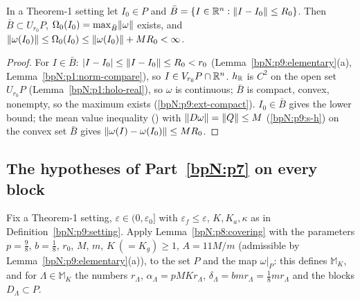 \begin{lemma}\label{bpN:p9:omega0}
In a Theorem-1 setting let $I_0\in P$ and $\bar B=\{I\in\mathbb{R}^n:\lVert I-I_0\rVert\le R_0\}$. Then $\bar B\subset U_{r_0}P$, $\Omega_0(I_0)=\max_{\bar B}\lVert \omega\rVert$ exists, and $\lVert \omega(I_0)\rVert\le\Omega_0(I_0)\le\lVert \omega(I_0)\rVert+MR_0<\infty$.
\end{lemma}
\begin{proof}
\label{stepN:p9:om-incl} For $I\in\bar B$: $\lvert I-I_0\rvert\le\lVert I-I_0\rVert\le R_0<r_0$ (Lemma~\ref{bpN:p9:elementary}(a), Lemma~\ref{bpN:p1:norm-compare}), so $I\in V_{r_0}P\cap\mathbb{R}^n$.
\label{stepN:p9:om-max} $h_{\mathbb{R}}$ is $C^2$ on the open set $U_{r_0}P$ (Lemma~\ref{bpN:p1:holo-real}), so $\omega$ is continuous; $\bar B$ is compact, convex, nonempty, so the maximum exists (\ref{bpN:p9:ext-compact}). $I_0\in\bar B$ gives the lower bound; the mean value inequality () with $\lVert D\omega\rVert=\lVert Q\rVert\le M$ (\ref{bpN:p9:s-h}) on the convex set $\bar B$ gives $\lVert \omega(I)-\omega(I_0)\rVert\le MR_0$.
\end{proof}

\subsection{The hypotheses of Part~\ref{bpN:p7} on every block}\label{bpN:p9:s-blocks}

Fix a Theorem-1 setting, $\varepsilon\in(0,\varepsilon_0]$ with $\varepsilon_f\le\varepsilon$, $K,K_a,\kappa$ as in Definition~\ref{bpN:p9:setting}. Apply Lemma~\ref{bpN:p8:covering} with the parameters $p=\frac98$, $b=\frac18$, $r_0$, $M$, $m$, $K\ (=K_g)\ge1$, $A=11M/m$ (admissible by Lemma~\ref{bpN:p9:elementary}(a)), to the set $P$ and the map $\omega|_P$: this defines $\mathbb M_K$, and for $\Lambda\in\mathbb M_K$ the numbers $r_\Lambda$, $\alpha_\Lambda=pMKr_\Lambda$, $\delta_\Lambda=bmr_\Lambda=\frac18mr_\Lambda$ and the blocks $D_\Lambda\subset P$.

